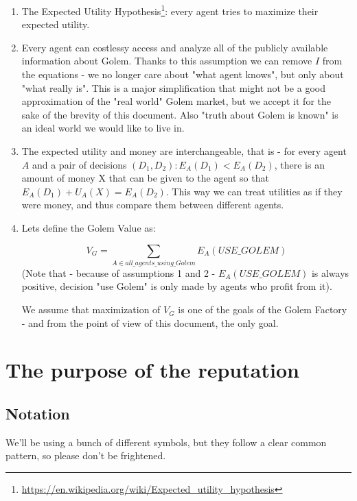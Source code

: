 \documentclass{article}
\begin{document}
\begin{enumerate}
\item The Expected Utility Hypothesis\footnote{\href{https://en.wikipedia.org/wiki/Expected\_utility\_hypothesis}{https://en.wikipedia.org/wiki/Expected\_utility\_hypothesis}}: every agent tries to maximize their expected utility.

\item Every agent can costlessy access and analyze all of the publicly available information about Golem. Thanks to this assumption we can remove $I$ from the equations - we no longer
    care about "what agent knows", but only about "what really is". This is a major simplification that might not be a good approximation of the "real world" Golem market, but we
    accept it for the sake of the brevity of this document. Also "truth about Golem is known" is an ideal world we would like to live in.

\item The expected utility and money are interchangeable, that is - for every agent $A$ and a pair of decisions $(D_1, D_2): E_A(D_1) < E_A(D_2)$, there is an amount of money X that
    can be given to the agent so that $E_A(D_1) + U_A(X) = E_A(D_2)$. This way we can treat utilities as if they were money, and thus compare them between different agents.

\item Lets define the Golem Value as:

\begin{equation}
    V_G = \sum_{A \in all\_agents\_using\_Golem}E_A(USE\_GOLEM)
\end{equation}
(Note that - because of assumptions 1 and 2 - $E_A(USE\_GOLEM)$ is always positive, decision "use Golem" is only made by agents who profit from it).

We assume that maximization of $V_G$ is one of the goals of the Golem Factory - and from the point of view of this document, the only goal.
\end{enumerate}

\section{The purpose of the reputation}
\subsection{Notation}

We'll be using a bunch of different symbols, but they follow a clear common pattern, so please don't be frightened.
\end{document}
